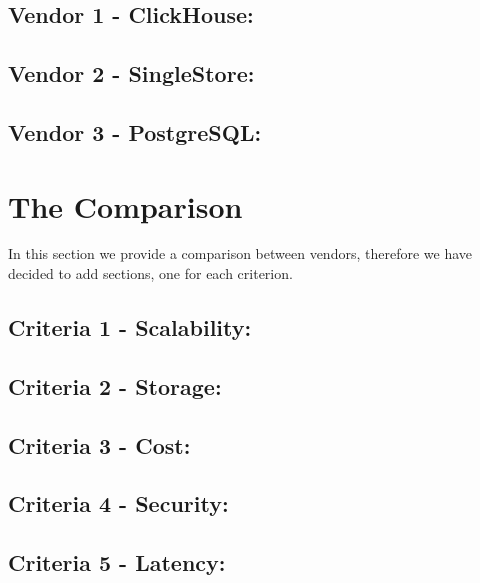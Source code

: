 \subsection{Vendor 1 - ClickHouse:}
    
\subsection{Vendor 2 - SingleStore:}
    
\subsection{Vendor 3 - PostgreSQL:}

\section{The Comparison}
In this section we provide a comparison between vendors, therefore we have decided to add sections, one for each criterion. 

\subsection{Criteria 1 - Scalability:}
 
\subsection{Criteria 2 - Storage:}

\subsection{Criteria 3 - Cost:}

\subsection{Criteria 4 - Security:}

\subsection{Criteria 5 - Latency:}
